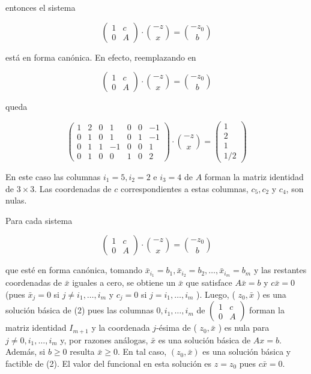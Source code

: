 \documentclass[10pt]{article}
\begin{document}
entonces el sistema

$$
\left(\begin{array}{cc}
1 & c \\
0 & A
\end{array}\right) \cdot\binom{-z}{x}=\binom{-z_{0}}{b}
$$

está en forma canónica. En efecto, reemplazando en

$$
\left(\begin{array}{cc}
1 & c \\
0 & A
\end{array}\right) \cdot\binom{-z}{x}=\binom{-z_{0}}{b}
$$

queda

$$
\left(\begin{array}{ccccccc}
1 & 2 & 0 & 1 & 0 & 0 & -1 \\
0 & 1 & 0 & 1 & 0 & 1 & -1 \\
0 & 1 & 1 & -1 & 0 & 0 & 1 \\
0 & 1 & 0 & 0 & 1 & 0 & 2
\end{array}\right) \cdot\binom{-z}{x}=\left(\begin{array}{c}
1 \\
2 \\
1 \\
1 / 2
\end{array}\right)
$$

En este caso las columnas $i_{1}=5, i_{2}=2$ e $i_{3}=4$ de $A$ forman la matriz identidad de $3 \times 3$. Las coordenadas de $c$ correspondientes a estas columnas, $c_{5}, c_{2}$ y $c_{4}$, son nulas.

Para cada sistema

$$
\left(\begin{array}{cc}
1 & c \\
0 & A
\end{array}\right) \cdot\binom{-z}{x}=\binom{-z_{0}}{b}
$$

que esté en forma canónica, tomando $\bar{x}_{i_{1}}=b_{1}, \bar{x}_{i_{2}}=b_{2}, \ldots, \bar{x}_{i_{m}}=b_{m}$ y las restantes coordenadas de $\bar{x}$ iguales a cero, se obtiene un $\bar{x}$ que satisface $A \bar{x}=b$ y $c \bar{x}=0$ (pues $\bar{x}_{j}=0$ si $j \neq i_{1}, \ldots, i_{m}$ y $c_{j}=0$ si $j=i_{1}, \ldots, i_{m}$ ). Luego, ( $z_{0}, \bar{x}$ ) es una solución básica de (2) pues las columnas $0, i_{1}, \ldots, i_{m}$ de $\left(\begin{array}{cc}1 & c \\ 0 & A\end{array}\right)$ forman la matriz identidad $I_{m+1}$ y la coordenada $j$-ésima de ( $z_{0}, \bar{x}$ ) es nula para $j \neq 0, i_{1}, \ldots, i_{m}$ y, por razones análogas, $\bar{x}$ es una solución básica de $A x=b$. Además, si $b \geq 0$ resulta $\bar{x} \geq 0$. En tal caso, $\left(z_{0}, \bar{x}\right)$ es una solución básica y factible de (2). El valor del funcional en esta solución es $z=z_{0}$ pues $c \bar{x}=0$.
\end{document}
